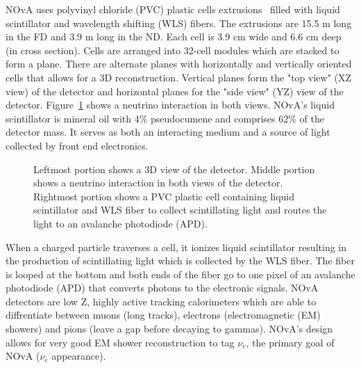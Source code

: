 \documentclass[12pt]{article}
\begin{document}
NOvA uses polyvinyl chloride (PVC) plastic cells extrusions~\cite{Talaga} filled with liquid scintillator and wavelength shifting (WLS) fibers. The extrusions are 15.5 m long in the FD and 3.9 m long in the ND. Each cell is 3.9 cm wide and 6.6 cm deep (in cross section).  Cells are arranged into 32-cell modules which are stacked to form a plane. There are alternate planes with horizontally and vertically oriented cells that allows for a 3D reconstruction. Vertical planes form the "top view" (XZ view) of the detector and horizontal planes for the "side view" (YZ) view of the detector. Figure~\ref{fig:detector3dview} shows a neutrino interaction in both views. NOvA's liquid scintillator is mineral oil with 4\% pseudocumene and comprises 62\% of the detector mass. It serves as both an interacting medium and a source of light collected by front end electronics. 
  
\begin{figure}[htb]
\begin{center}
\caption{Leftmost portion shows a 3D view of the detector. Middle portion shows a neutrino interaction in both views of the detector. Rightmost portion shows a PVC plastic cell containing liquid scintillator and WLS fiber to collect scintillating light and routes the light to an avalanche photodiode (APD).}
\label{fig:detector3dview}
\end{center}
\end{figure}  
   
 When a charged particle traverses a cell, it ionizes liquid scintillator resulting in the production of scintillating light which is collected by the WLS fiber. The fiber is looped at the bottom and both ends of the fiber go to one pixel of an avalanche photodiode (APD) that converts photons to the electronic signals. 
 NOvA detectors are low Z, highly active tracking calorimeters which are able to diffrentiate between muons (long tracks), electrons (electromagnetic (EM) showers) and pions (leave a gap before decaying to gammas). NOvA's design allows for very good EM shower reconstruction to tag $\nu_{e}$, the primary goal of NOvA ($\nu_{e}$ appearance). 

 
\end{document}
